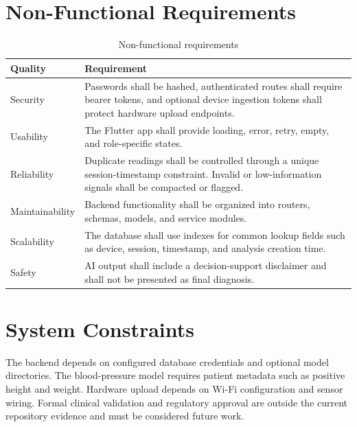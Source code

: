 \section{Non-Functional Requirements}

\begin{table}[H]
\centering
\caption{Non-functional requirements}
\begin{tabular}{p{} p{}}
\toprule
\textbf{Quality} & \textbf{Requirement}\\
\midrule
Security & Passwords shall be hashed, authenticated routes shall require bearer tokens, and optional device ingestion tokens shall protect hardware upload endpoints.\\
Usability & The Flutter app shall provide loading, error, retry, empty, and role-specific states.\\
Reliability & Duplicate readings shall be controlled through a unique session-timestamp constraint. Invalid or low-information signals shall be compacted or flagged.\\
Maintainability & Backend functionality shall be organized into routers, schemas, models, and service modules.\\
Scalability & The database shall use indexes for common lookup fields such as device, session, timestamp, and analysis creation time.\\
Safety & AI output shall include a decision-support disclaimer and shall not be presented as final diagnosis.\\
\bottomrule
\end{tabular}
\end{table}

\section{System Constraints}

The backend depends on configured database credentials and optional model directories. The blood-pressure model requires patient metadata such as positive height and weight. Hardware upload depends on Wi-Fi configuration and sensor wiring. Formal clinical validation and regulatory approval are outside the current repository evidence and must be considered future work.
